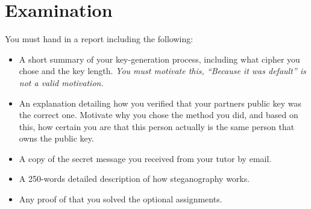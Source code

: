 \documentclass[a4paper,nocourse]{miunasgn}
\begin{document}
\section{Examination}
\label{sec:Exam}
You must hand in a report including the following:
\begin{itemize}
  \item A short summary of your key-generation process, including what cipher 
    you chose and the key length.
    \emph{You must motivate this, ``Because it was default'' is not a valid 
    motivation.}
  \item An explanation detailing how you verified that your partners public key 
    was the correct one.
    Motivate why you chose the method you did, and based on this, how certain 
    you are that this person actually is the same person that owns the public 
    key.
  \item A copy of the secret message you received from your tutor by email.
  \item A 250-words detailed description of how steganography works.
  \item Any proof of that you solved the optional assignments.

\end{itemize}


\printbibliography
\end{document}
